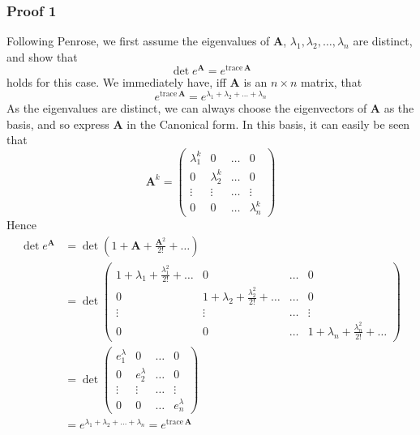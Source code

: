 \subsubsection*{Proof 1}
Following Penrose, we first assume the eigenvalues of \textbf{A}, $\lambda_1,\lambda_2,\ldots,\lambda_n$ are distinct, and show that 
$$\det e^\textbf{A}=e^{\text{trace}\,\textbf{A}}$$ 
holds for this case. We immediately have, iff \textbf{A} is an $n\times n$ matrix, that
$$e^{\text{trace}\,\textbf{A}}=e^{\lambda_1+\lambda_2+\ldots+\lambda_n}$$
As the eigenvalues are distinct, we can always choose the eigenvectors of \textbf{A} as the basis, and so express \textbf{A} in the Canonical form. In this basis, it can easily be seen that
$$\textbf{A}^k=
\begin{pmatrix} 
\lambda_{1}^{k}&0 &\ldots&0\\
0&\lambda_{2}^{k}&\ldots&0\\
\vdots & \vdots & \ldots &\vdots \\
0&0&\ldots &\lambda_{n}^{k}
\end{pmatrix}$$
Hence
\begin{align*}
\det e^\textbf{A}&=\det \left ( 1+\textbf{A}+\frac{\textbf{A}^2}{2!}+\ldots\right)\\
&=\det \begin{pmatrix} 
1+\lambda_{1}+\frac{\lambda_{1}^{2}}{2!}+\ldots&0 &\ldots&0\\
0&1+\lambda_{2}+\frac{\lambda_{2}^{2}}{2!}+\ldots&\ldots&0\\
\vdots & \vdots & \ldots &\vdots \\
0&0&\ldots &1+\lambda_{n}+\frac{\lambda_{n}^{2}}{2!}+\ldots
\end{pmatrix}\\
&=\det \begin{pmatrix} 
e^\lambda_1&0 &\ldots&0\\
0&e^\lambda_2&\ldots&0\\
\vdots & \vdots & \ldots &\vdots \\
0&0&\ldots &e^\lambda_n
\end{pmatrix}\\
&=e^{\lambda_1+\lambda_2+\ldots+\lambda_n}=e^{\text{trace}\,\textbf{A}}
\end{align*}
